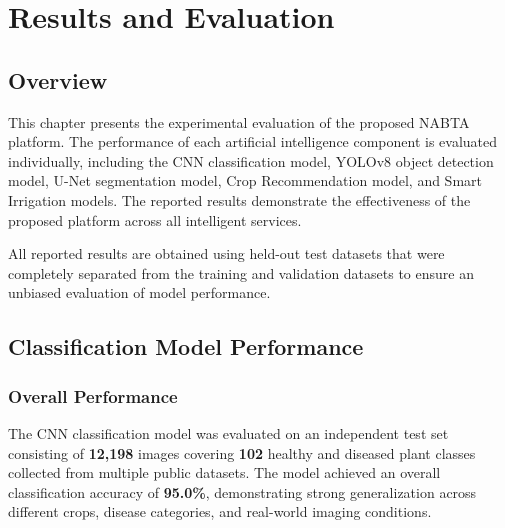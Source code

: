 
\chapter{Results and Evaluation}
\label{chap:results}


\section{Overview}
\label{sec:results_overview}

This chapter presents the experimental evaluation of the proposed NABTA platform. The performance of each artificial intelligence component is evaluated individually, including the CNN classification model, YOLOv8 object detection model, U-Net segmentation model, Crop Recommendation model, and Smart Irrigation models. The reported results demonstrate the effectiveness of the proposed platform across all intelligent services.

All reported results are obtained using held-out test datasets that were completely separated from the training and validation datasets to ensure an unbiased evaluation of model performance.

\section{Classification Model Performance}
\label{sec:cnn_results}

\subsection{Overall Performance}
\label{subsec:cnn_acc}

The CNN classification model was evaluated on an independent test set consisting of \textbf{12,198} images covering \textbf{102} healthy and diseased plant classes collected from multiple public datasets. The model achieved an overall classification accuracy of \textbf{95.0\%}, demonstrating strong generalization across different crops, disease categories, and real-world imaging conditions.

